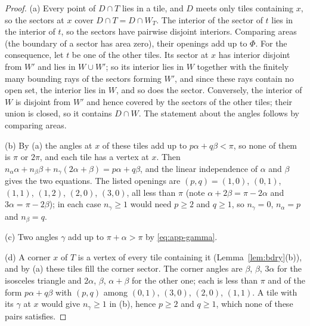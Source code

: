 \documentclass[11pt]{amsart}
\theoremstyle{remark}
\begin{document}
\begin{proof}
(a) Every point of $D\cap T$ lies in a tile, and $D$ meets only tiles containing $x$, so the sectors at $x$ cover $D\cap T=D\cap W_T$. The interior of the sector of $t$ lies in the interior of $t$, so the sectors have pairwise disjoint interiors. Comparing areas (the boundary of a sector has area zero), their openings add up to $\Phi$. For the consequence, let $t$ be one of the other tiles. Its sector at $x$ has interior disjoint from $W'$ and lies in $W\cup W'$; so its interior lies in $W$ together with the finitely many bounding rays of the sectors forming $W'$, and since these rays contain no open set, the interior lies in $W$, and so does the sector. Conversely, the interior of $W$ is disjoint from $W'$ and hence covered by the sectors of the other tiles; their union is closed, so it contains $D\cap W$. The statement about the angles follows by comparing areas.

(b) By (a) the angles at $x$ of these tiles add up to $p\alpha+q\beta<\pi$, so none of them is $\pi$ or $2\pi$, and each tile has a vertex at $x$. Then $n_\alpha\alpha+n_\beta\beta+n_\gamma(2\alpha+\beta)=p\alpha+q\beta$, and the linear independence of $\alpha$ and $\beta$ gives the two equations. The listed openings are $(p,q)=(1,0)$, $(0,1)$, $(1,1)$, $(1,2)$, $(2,0)$, $(3,0)$, all less than $\pi$ (note $\alpha+2\beta=\pi-2\alpha$ and $3\alpha=\pi-2\beta$); in each case $n_\gamma\ge1$ would need $p\ge2$ and $q\ge1$, so $n_\gamma=0$, $n_\alpha=p$ and $n_\beta=q$.

(c) Two angles $\gamma$ add up to $\pi+\alpha>\pi$ by \eqref{eq:app-gamma}.

(d) A corner $x$ of $T$ is a vertex of every tile containing it (Lemma~\ref{lem:bdry}(b)), and by (a) these tiles fill the corner sector. The corner angles are $\beta$, $\beta$, $3\alpha$ for the isosceles triangle and $2\alpha$, $\beta$, $\alpha+\beta$ for the other one; each is less than $\pi$ and of the form $p\alpha+q\beta$ with $(p,q)$ among $(0,1)$, $(3,0)$, $(2,0)$, $(1,1)$. A tile with its $\gamma$ at $x$ would give $n_\gamma\ge1$ in (b), hence $p\ge2$ and $q\ge1$, which none of these pairs satisfies.
\end{proof}
\end{document}
